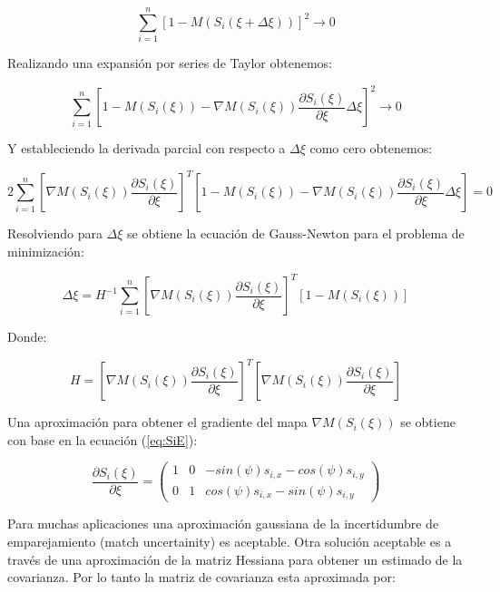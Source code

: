 \documentclass[10pt,a4paper]{article}
\begin{document}
\begin{equation}
	\sum_{i=1}^{n} [1 - M(S_{i}(\xi + \Delta\xi))]^{2} \to 0
\end{equation}

Realizando una expansión por series de Taylor obtenemos:

\begin{equation}
	\sum_{i=1}^{n} \left[
		1 - M(S_{i}(\xi)) - 
			\nabla M(S_{i}(\xi)) \frac{\partial S_{i}(\xi)}{\partial \xi} \Delta\xi
	\right]^{2} \to 0
\end{equation}

Y estableciendo la derivada parcial con respecto a $ \Delta \xi $ como cero obtenemos:

\begin{equation}
	2 \sum_{i=1}^{n} \left[
		\nabla M(S_{i}(\xi)) \frac{\partial S_{i}(\xi)}{\partial \xi}
	\right]^{T} 
	\left[
		1 - M(S_{i}(\xi)) - 
			\nabla M(S_{i}(\xi)) \frac{\partial S_{i}(\xi)}{\partial \xi} \Delta\xi
	 \right] 
	 = 0
\end{equation}

Resolviendo para $ \Delta \xi $ se obtiene la ecuación de Gauss-Newton para el problema de minimización:

\begin{equation}
	\Delta \xi = H^{-1} \sum_{i=1}^{n} \left[
		\nabla M(S_{i}(\xi)) \frac{\partial S_{i}(\xi)}{\partial \xi}
	\right]^{T}
	\left[
		1 - M(S_{i}(\xi))
	 \right] 
\end{equation}

Donde:

\begin{equation}
	H = \left[
		\nabla M(S_{i}(\xi)) \frac{\partial S_{i}(\xi)}{\partial \xi}
	\right]^{T}
	\left[
		\nabla M(S_{i}(\xi)) \frac{\partial S_{i}(\xi)}{\partial \xi}
	\right]
\end{equation}

Una aproximación para obtener el gradiente del mapa $ \nabla M(S_{i}(\xi)) $ se obtiene con base en la ecuación (\ref{eq:SiE}):

\begin{equation}
	\frac{\partial S_{i}(\xi)}{\partial \xi} = 
	\begin{pmatrix}
		1 & 0 & -sin(\psi) s_{i,x} - cos(\psi)s_{i,y} \\
		0 & 1 & cos(\psi) s_{i,x} - sin(\psi)s_{i,y}
	\end{pmatrix}
\end{equation}

Para muchas aplicaciones una aproximación gaussiana de la incertidumbre de emparejamiento (match uncertainity) es aceptable. Otra solución aceptable es a través de una aproximación de la matriz Hessiana para obtener un estimado de la covarianza. Por lo tanto la matriz de covarianza esta aproximada por:
\end{document}
